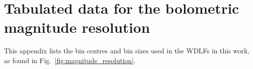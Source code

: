 \documentclass[fleqn,usenatbib]{mnras}
\begin{document}






\appendix

\section{Tabulated data for the bolometric magnitude resolution}
This appendix lists the bin centres and bin sizes used in the WDLFs in this work,
as found in Fig.~\ref{fig:magnitude_resolution}.
\end{document}
